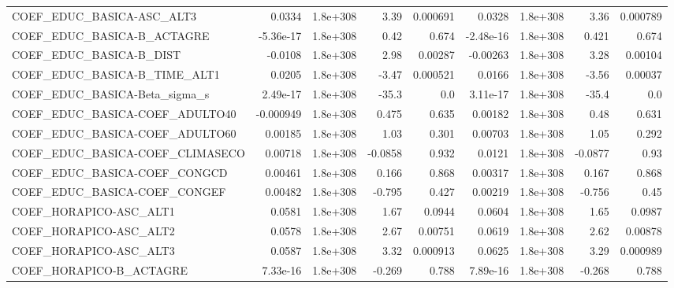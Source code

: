 \begin{tabular}{lrrrrrrrr}
COEF\_EDUC\_BASICA-ASC\_ALT3         &      0.0334 &     1.8e+308 &      3.39 & 0.000691 &     0.0328 &    1.8e+308 &         3.36 &      0.000789 \\
COEF\_EDUC\_BASICA-B\_ACTAGRE        &   -5.36e-17 &     1.8e+308 &      0.42 &    0.674 &  -2.48e-16 &    1.8e+308 &        0.421 &         0.674 \\
COEF\_EDUC\_BASICA-B\_DIST           &     -0.0108 &     1.8e+308 &      2.98 &  0.00287 &   -0.00263 &    1.8e+308 &         3.28 &       0.00104 \\
COEF\_EDUC\_BASICA-B\_TIME\_ALT1      &      0.0205 &     1.8e+308 &     -3.47 & 0.000521 &     0.0166 &    1.8e+308 &        -3.56 &       0.00037 \\
COEF\_EDUC\_BASICA-Beta\_sigma\_s     &    2.49e-17 &     1.8e+308 &     -35.3 &      0.0 &   3.11e-17 &    1.8e+308 &        -35.4 &           0.0 \\
COEF\_EDUC\_BASICA-COEF\_ADULTO40    &   -0.000949 &     1.8e+308 &     0.475 &    0.635 &    0.00182 &    1.8e+308 &         0.48 &         0.631 \\
COEF\_EDUC\_BASICA-COEF\_ADULTO60    &     0.00185 &     1.8e+308 &      1.03 &    0.301 &    0.00703 &    1.8e+308 &         1.05 &         0.292 \\
COEF\_EDUC\_BASICA-COEF\_CLIMASECO   &     0.00718 &     1.8e+308 &   -0.0858 &    0.932 &     0.0121 &    1.8e+308 &      -0.0877 &          0.93 \\
COEF\_EDUC\_BASICA-COEF\_CONGCD      &     0.00461 &     1.8e+308 &     0.166 &    0.868 &    0.00317 &    1.8e+308 &        0.167 &         0.868 \\
COEF\_EDUC\_BASICA-COEF\_CONGEF      &     0.00482 &     1.8e+308 &    -0.795 &    0.427 &    0.00219 &    1.8e+308 &       -0.756 &          0.45 \\
COEF\_HORAPICO-ASC\_ALT1            &      0.0581 &     1.8e+308 &      1.67 &   0.0944 &     0.0604 &    1.8e+308 &         1.65 &        0.0987 \\
COEF\_HORAPICO-ASC\_ALT2            &      0.0578 &     1.8e+308 &      2.67 &  0.00751 &     0.0619 &    1.8e+308 &         2.62 &       0.00878 \\
COEF\_HORAPICO-ASC\_ALT3            &      0.0587 &     1.8e+308 &      3.32 & 0.000913 &     0.0625 &    1.8e+308 &         3.29 &      0.000989 \\
COEF\_HORAPICO-B\_ACTAGRE           &    7.33e-16 &     1.8e+308 &    -0.269 &    0.788 &   7.89e-16 &    1.8e+308 &       -0.268 &         0.788 \\

\end{tabular}
